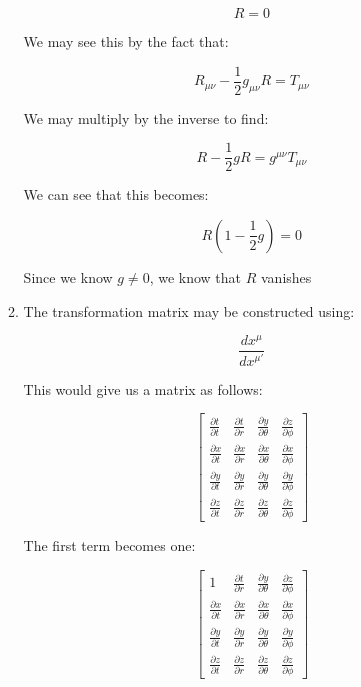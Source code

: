 \begin{enumerate}
\begin{enumerate}
        $$\boxed{R=0}$$

        We may see this by the fact that:

        $$R_{\mu\nu}-\frac{1}{2}g_{\mu\nu}R=T_{\mu\nu}$$

        We may multiply by the inverse to find:

        $$R-\frac{1}{2}gR=g^{\mu\nu}T_{\mu\nu}$$

        We can see that this becomes:

        $$R\left(1-\frac{1}{2}g\right)=0$$

        Since we know $g\neq0$, we know that $R$ vanishes

      \item The transformation matrix may be constructed using:

        $$\frac{dx^{\mu}}{dx^{\mu'}}$$

        This would give us a matrix as follows:

        $$\left[ \begin{matrix} \frac{\partial t}{\partial t} & \frac{\partial t}{\partial r} & \frac{\partial y}{\partial \theta} & \frac{\partial z}{\partial \phi}\\ \frac{\partial x}{\partial t} & \frac{\partial x}{\partial r} & \frac{\partial x}{\partial \theta} & \frac{\partial x}{\partial \phi}\\\frac{\partial y}{\partial t} & \frac{\partial y}{\partial r} & \frac{\partial y}{\partial \theta} & \frac{\partial y}{\partial \phi}\\\frac{\partial z}{\partial t} & \frac{\partial z}{\partial r} & \frac{\partial z}{\partial \theta} & \frac{\partial z}{\partial \phi}\end{matrix} \right]$$

        The first term becomes one:

        $$\left[ \begin{matrix} 1 & \frac{\partial t}{\partial r} & \frac{\partial y}{\partial \theta} & \frac{\partial z}{\partial \phi}\\ \frac{\partial x}{\partial t} & \frac{\partial x}{\partial r} & \frac{\partial x}{\partial \theta} & \frac{\partial x}{\partial \phi}\\\frac{\partial y}{\partial t} & \frac{\partial y}{\partial r} & \frac{\partial y}{\partial \theta} & \frac{\partial y}{\partial \phi}\\\frac{\partial z}{\partial t} & \frac{\partial z}{\partial r} & \frac{\partial z}{\partial \theta} & \frac{\partial z}{\partial \phi}\end{matrix} \right]$$


\end{enumerate}
\end{enumerate}
